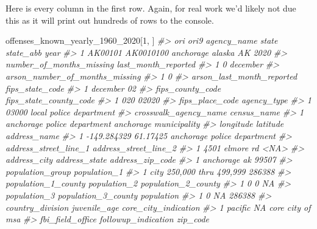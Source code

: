 \documentclass[
]{krantz}
\makeatletter
\newenvironment{Shaded}{\begin{snugshade}}{\end{snugshade}}
\newcommand{\CommentTok}[1]{\textcolor[rgb]{0.37,0.37,0.37}{\textit{#1}}}
\newcommand{\DecValTok}[1]{\textcolor[rgb]{0.06,0.06,0.06}{#1}}
\newcommand{\NormalTok}[1]{#1}
\newenvironment{kframe}{%
\medskip{}
\setlength{\fboxsep}{.8em}
 \def\at@end@of@kframe{}%
 \ifinner\ifhmode%
  \def\at@end@of@kframe{\end{minipage}}%
  \begin{minipage}{\columnwidth}%
 \fi\fi%
 \def\FrameCommand##1{\hskip\@totalleftmargin \hskip-\fboxsep
 \colorbox{shadecolor}{##1}\hskip-\fboxsep
     \hskip-\linewidth \hskip-\@totalleftmargin \hskip\columnwidth}%
 \MakeFramed {\advance\hsize-\width
   \@totalleftmargin\z@ \linewidth\hsize
   \@setminipage}}%
 {\par\unskip\endMakeFramed%
 \at@end@of@kframe}
\renewenvironment{Shaded}{\begin{kframe}}{\end{kframe}}
\makeatother
\begin{document}
Here is every column in the first row. Again, for real work we'd likely not due this as it will print out hundreds of rows to the console.

\begin{Shaded}
\begin{Highlighting}[]
\NormalTok{offenses\_known\_yearly\_1960\_2020[}\DecValTok{1}\NormalTok{, ]}
\CommentTok{\#\textgreater{}       ori      ori9 agency\_name  state state\_abb year}
\CommentTok{\#\textgreater{} 1 AK00101 AK0010100   anchorage alaska        AK 2020}
\CommentTok{\#\textgreater{}   number\_of\_months\_missing last\_month\_reported}
\CommentTok{\#\textgreater{} 1                        0            december}
\CommentTok{\#\textgreater{}   arson\_number\_of\_months\_missing}
\CommentTok{\#\textgreater{} 1                              0}
\CommentTok{\#\textgreater{}   arson\_last\_month\_reported fips\_state\_code}
\CommentTok{\#\textgreater{} 1                  december              02}
\CommentTok{\#\textgreater{}   fips\_county\_code fips\_state\_county\_code}
\CommentTok{\#\textgreater{} 1              020                  02020}
\CommentTok{\#\textgreater{}   fips\_place\_code             agency\_type}
\CommentTok{\#\textgreater{} 1           03000 local police department}
\CommentTok{\#\textgreater{}         crosswalk\_agency\_name            census\_name}
\CommentTok{\#\textgreater{} 1 anchorage police department anchorage municipality}
\CommentTok{\#\textgreater{}     longitude latitude                address\_name}
\CommentTok{\#\textgreater{} 1 {-}149.284329 61.17425 anchorage police department}
\CommentTok{\#\textgreater{}   address\_street\_line\_1 address\_street\_line\_2}
\CommentTok{\#\textgreater{} 1        4501 elmore rd                  \textless{}NA\textgreater{}}
\CommentTok{\#\textgreater{}   address\_city address\_state address\_zip\_code}
\CommentTok{\#\textgreater{} 1    anchorage            ak            99507}
\CommentTok{\#\textgreater{}            population\_group population\_1}
\CommentTok{\#\textgreater{} 1 city 250,000 thru 499,999       286388}
\CommentTok{\#\textgreater{}   population\_1\_county population\_2 population\_2\_county}
\CommentTok{\#\textgreater{} 1                   0            0                  NA}
\CommentTok{\#\textgreater{}   population\_3 population\_3\_county population}
\CommentTok{\#\textgreater{} 1            0                  NA     286388}
\CommentTok{\#\textgreater{}   country\_division juvenile\_age core\_city\_indication}
\CommentTok{\#\textgreater{} 1          pacific           NA     core city of msa}
\CommentTok{\#\textgreater{}   fbi\_field\_office     followup\_indication zip\_code}

\end{Highlighting}
\end{Shaded}
\end{document}

